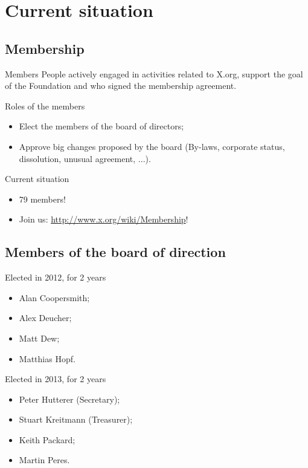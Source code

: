 \documentclass{beamer}
\begin{document}
	\section{Current situation}
		\subsection{Membership}
		\begin{frame}
			\begin{block}{Members}
				People actively engaged in activities related to X.org, 
support the goal of the Foundation and who signed the membership agreement.
			\end{block}

			\begin{block}{Roles of the members}
				\begin{itemize}
					\item Elect the members of the board of
directors;
					\item Approve big changes proposed by the 
board (By-laws, corporate status, dissolution, unusual agreement, ...).
				\end{itemize}
			\end{block}

			\begin{block}{Current situation}
				\begin{itemize}
					\item 79 members!
					\item Join us:
\url{http://www.x.org/wiki/Membership}!
				\end{itemize}
			\end{block}
		\end{frame}

		\subsection{Members of the board of direction}
		\begin{frame}
			\begin{block}{Elected in 2012, for 2 years}
				\begin{itemize}
					\item Alan Coopersmith;
					\item Alex Deucher;
					\item Matt Dew;
					\item Matthias Hopf.
				\end{itemize}
			\end{block}

			\begin{block}{Elected in 2013, for 2 years}
				\begin{itemize}
					\item Peter Hutterer (Secretary);
					\item Stuart Kreitmann (Treasurer);
					\item Keith Packard;
					\item Martin Peres.
				\end{itemize}
			\end{block}
		\end{frame}
\end{document}
